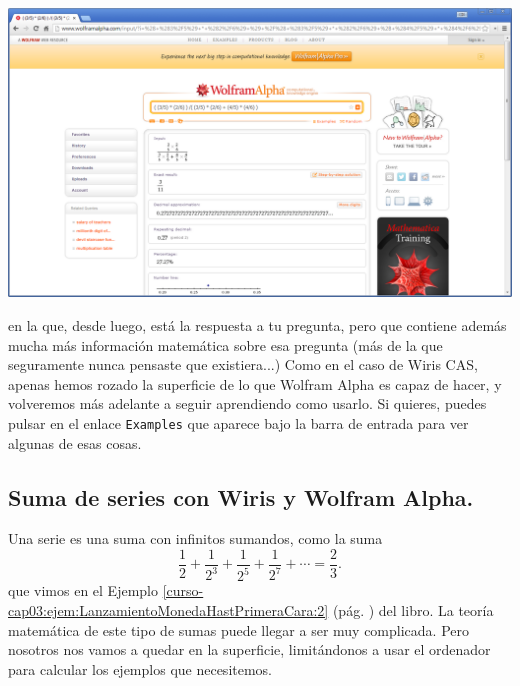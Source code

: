 \documentclass[10pt,a4paper]{article}\usepackage[]{graphicx}\usepackage[]{color}
\newcounter {cont01}
\begin{document}
\begin{center}
\includegraphics[width=15.5cm]{./fig/Tut04-17.png}
\end{center}
en la que, desde luego, está la respuesta a tu pregunta, pero que contiene además mucha más información matemática sobre esa pregunta (más de la que seguramente nunca pensaste que existiera...) Como en el caso de Wiris CAS, apenas hemos rozado la superficie de lo que Wolfram Alpha es capaz de hacer, y volveremos más adelante a seguir aprendiendo como usarlo. Si quieres, puedes pulsar en el enlace {\tt Examples} que aparece bajo la barra de entrada para ver algunas de esas cosas.


\subsection{Suma de series con Wiris y Wolfram Alpha.}
\label{tut05:subsec:SeriesWirisWolfram}

Una serie es una suma con infinitos sumandos, como la suma
\[\dfrac{1}{2}+\dfrac{1}{2^3}+\dfrac{1}{2^5}+\dfrac{1}{2^7}+\cdots=\dfrac{2}{3}.\]
que vimos en el Ejemplo \ref{curso-cap03:ejem:LanzamientoMonedaHastPrimeraCara:2} (pág. \pageref{curso-cap03:ejem:LanzamientoMonedaHastPrimeraCara:2}) del libro. La teoría matemática de este tipo de sumas puede llegar a ser muy complicada. Pero nosotros nos vamos a quedar en la superficie, limitándonos a usar el ordenador para calcular los ejemplos que necesitemos.
\end{document}
